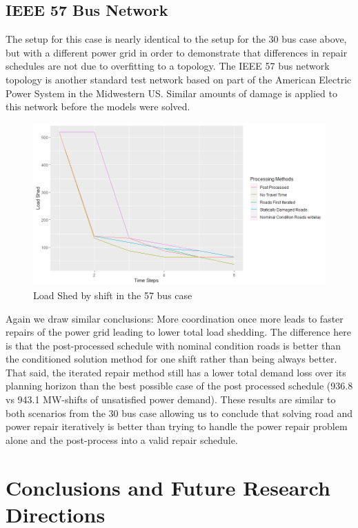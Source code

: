 \documentclass[10pt]{article}
\begin{document}
\subsection{IEEE 57 Bus Network}
 \vspace*{-12pt}
The setup for this case is nearly identical to the setup for the 30 bus case above, but with a different power grid in order to demonstrate that differences in repair schedules are not due to overfitting to a topology. The IEEE 57 bus network topology is another standard test network based on part of the American Electric Power System in the Midwestern US. Similar amounts of damage is applied to this network before the models were solved.

\begin{figure}[htbp]
	\centering
	\caption{Load Shed by shift in the 57 bus case}
	\includegraphics[width=.7\textwidth, height=0.5\textheight,keepaspectratio]{RPlot57Fixed.png}
	
\end{figure}

Again we draw similar conclusions: More coordination once more leads to faster repairs of the power grid leading to lower total load shedding. The difference here is that the post-processed schedule with nominal condition roads is better than the conditioned solution method for one shift rather than being always better. That said, the iterated repair method still has a lower total demand loss over its planning horizon than the best possible case of the post processed schedule (936.8 vs 943.1 MW-shifts of unsatisfied power demand). These results are similar to both scenarios from the 30 bus case allowing us to conclude that solving road and power repair iteratively is better than trying to handle the power repair problem alone and the post-process into a valid repair schedule.
\section{\large{Conclusions and Future Research Directions}}
\label{sec:issues}
\vspace*{-12pt}
\end{document}
